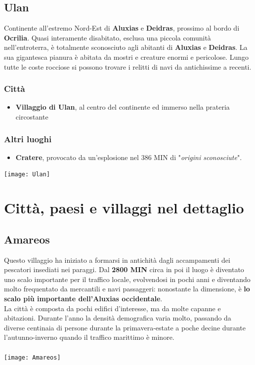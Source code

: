 \documentclass[10pt,twoside,onecolumn,openany]{book}
\begin{document}
\subsection{Ulan}
Continente all'estremo Nord-Est di \textbf{Aluxias} e \textbf{Deidras}, prossimo al bordo di \textbf{Ocrilia}. Quasi interamente disabitato, esclusa una piccola comunità nell'entroterra, è totalmente sconosciuto agli abitanti di \textbf{Aluxias} e \textbf{Deidras}. La sua gigantesca pianura è abitata da mostri e creature enormi e pericolose. Lungo tutte le coste rocciose si possono trovare i relitti di navi da antichissime a recenti.\\
\begin{multicols}{2}
\subsubsection{Città}
\begin{itemize}
\item \textbf{Villaggio di Ulan}, al centro del continente ed immerso nella prateria circostante
\end{itemize}
\columnbreak
\subsubsection{Altri luoghi}
\begin{itemize}
\item \textbf{Cratere}, provocato da un'esplosione nel 386 MIN di "\textit{origini sconosciute}".
\end{itemize}
\end{multicols}
\begin{center}
\texttt{[image: Ulan]}
\end{center}
\newpage
\section{Città, paesi e villaggi nel dettaglio}
\subsection{Amareos}
Questo villaggio ha iniziato a formarsi in antichità dagli accampamenti dei pescatori insediati nei paraggi. Dal \textbf{2800 MIN} circa in poi il luogo è diventato uno scalo importante per il traffico locale, evolvendosi in pochi anni e diventando molto frequentato da mercantili e navi passaggeri: nonostante la dimensione, è \textbf{lo scalo più importante dell'Aluxias occidentale}.\\
La città è composta da pochi edifici d'interesse, ma da molte capanne e abitazioni. Durante l'anno la densità demografica varia molto, passando da diverse centinaia di persone durante la primavera-estate a poche decine durante l'autunno-inverno quando il traffico marittimo è minore.\\
\\
\texttt{[image: Amareos]}
\end{document}
